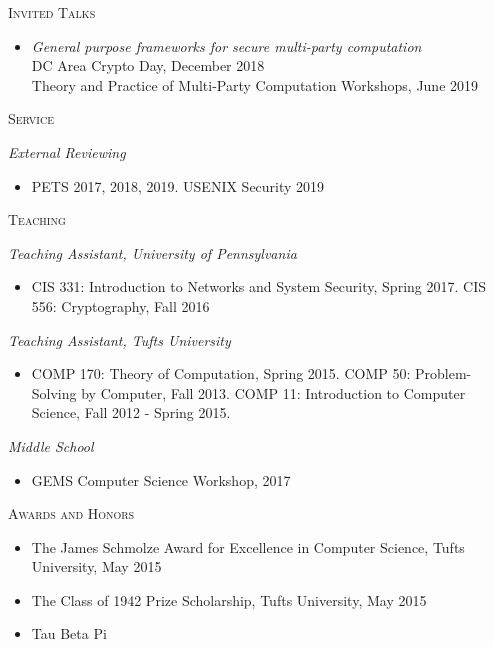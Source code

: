 \documentclass{article}
\begin{document}
\textsc{Invited Talks}
\begin{itemize}[label={}]
\item \emph{General purpose frameworks for secure multi-party computation}\\
  DC Area Crypto Day, December 2018 \\
  Theory and Practice of Multi-Party Computation Workshops, June 2019
\end{itemize}

\textsc{Service}

\textit{External Reviewing}
\begin{itemize}[label={},noitemsep]
\item PETS 2017, 2018, 2019. USENIX Security 2019
\end{itemize}

\textsc{Teaching}

\textit{Teaching Assistant, University of Pennsylvania} 
\begin{itemize}[label={}]
\item CIS 331: Introduction to Networks and System Security, Spring 2017.
CIS 556: Cryptography, Fall 2016
\end{itemize}

\textit{Teaching Assistant, Tufts University} 
\begin{itemize}[label={}]
\item COMP 170: Theory of Computation, Spring 2015.
COMP 50: Problem-Solving by Computer, Fall 2013.
COMP 11: Introduction to Computer Science, Fall 2012 - Spring 2015.
\end{itemize}

\textit{Middle School}
\begin{itemize}[label={},noitemsep]
\item GEMS Computer Science Workshop, 2017
\end{itemize}

\textsc{Awards and Honors}
\begin{itemize}[label={},noitemsep]
\item The James Schmolze Award for Excellence in Computer Science, Tufts University, May 2015
\item The Class of 1942 Prize Scholarship, Tufts University, May 2015
\item Tau Beta Pi
\end{itemize}
\end{document}
